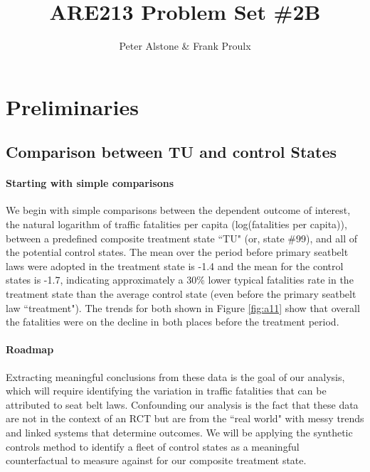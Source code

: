 \documentclass[letterpaper, 12pt]{article}
\begin{document}
\title{ARE213 Problem Set \#2B}
\author{Peter Alstone \& Frank Proulx}
\maketitle

\section{Preliminaries}

\subsection{Comparison between TU and control States}

\paragraph{Starting with simple comparisons}
We begin with simple comparisons between the dependent outcome of interest, the natural logarithm of traffic fatalities per capita (log(fatalities per capita)), between a predefined composite treatment state ``TU" (or, state \#99), and all of the potential control states.  The mean over the period before primary seatbelt laws were adopted in the treatment state is -1.4 and the mean for the control states is -1.7, indicating approximately a 30\% lower typical fatalities rate in the treatment state than the average control state (even before the primary seatbelt law ``treatment").  The trends for both shown in Figure \ref{fig:a11} show that overall the fatalities were on the decline in both places before the treatment period.  

\paragraph{Roadmap}
Extracting meaningful conclusions from these data is the goal of our analysis, which will require identifying the variation in traffic fatalities that can be attributed to seat belt laws.  Confounding our analysis is the fact that these data are not in the context of an RCT but are from the ``real world" with messy trends and linked systems that determine outcomes.  We will be applying the synthetic controls method to identify a fleet of control states as a meaningful counterfactual to measure against for our composite treatment state.  
\end{document}
